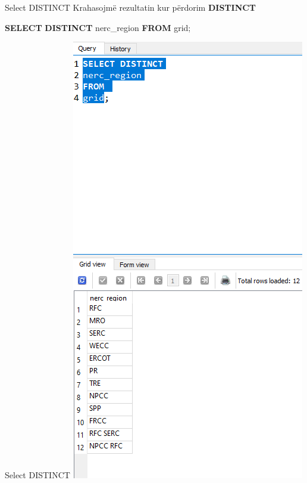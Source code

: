 \documentclass[
  ignorenonframetext,
]{beamer}
\newenvironment{Shaded}{\begin{snugshade}}{\end{snugshade}}
\newcommand{\KeywordTok}[1]{\textcolor[rgb]{0.13,0.29,0.53}{\textbf{#1}}}
\newcommand{\NormalTok}[1]{#1}
\begin{document}
\begin{frame}[fragile]{Select DISTINCT}
\label{select-distinct-3}
Krahasojmë rezultatin kur përdorim \textbf{DISTINCT}


\begin{Shaded}
\begin{Highlighting}[]
\KeywordTok{SELECT} \KeywordTok{DISTINCT}
\NormalTok{nerc\_region}
\KeywordTok{FROM} 
\NormalTok{grid;}
\end{Highlighting}
\end{Shaded}
\end{frame}

\begin{frame}{Select DISTINCT}
\label{select-distinct-4}
\includegraphics{./Figs/sql19.png}
\end{frame}
\end{document}
